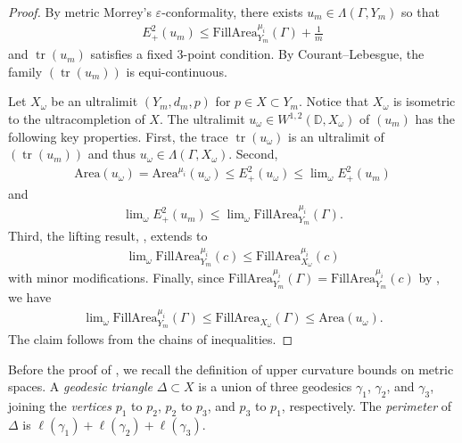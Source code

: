 \documentclass[a4paper,leqno]{amsart}
\numberwithin{equation}{section}
\theoremstyle{remark}
\theoremstyle{remark}
\DeclareMathOperator{\trace}{tr}
\begin{document}
\begin{proof}
By metric Morrey's $\varepsilon$-conformality, there exists $u_m \in \Lambda( \Gamma, Y_m )$ so that
\begin{align*}
    E^{2}_{+}( u_m ) \leq \mathrm{FillArea}^{\mu_i}_{Y_m}( \Gamma ) + \frac{ 1 }{ m }
\end{align*}
and $\trace( u_m )$ satisfies a fixed $3$-point condition. By Courant--Lebesgue, the family $( \trace( u_m ) )$ is equi-continuous.

Let $X_\omega$ be an ultralimit $( Y_m, d_m, p )$ for $p \in X \subset Y_m$. Notice that $X_\omega$ is isometric to the ultracompletion of $X$. The ultralimit $u_\omega \in W^{1,2}( \mathbb{D}, X_\omega )$ of $( u_m )$ has the following key properties. First, the trace $\trace( u_\omega )$ is an ultralimit of $( \trace( u_m ) )$ and thus $u_\omega \in \Lambda( \Gamma, X_\omega )$. Second,
\begin{align*}
    \mathrm{Area}(u_\omega) = \mathrm{Area}^{\mu_i}( u_\omega ) \leq E^{2}_{+}( u_\omega ) \leq \lim\nolimits_{\omega} E^{2}_{+}( u_m )
\end{align*}
and
\begin{align*}
    \lim\nolimits_{\omega} E^{2}_{+}( u_m )
    \leq
    \lim\nolimits_{\omega} \mathrm{FillArea}^{\mu_i}_{Y_m}( \Gamma ).
\end{align*}
Third, the lifting result, \cite[Theorem 5.1]{Wen:2019}, extends to
\begin{align*}
    \lim\nolimits_{\omega} \mathrm{FillArea}^{\mu_i}_{Y_m}( c ) \leq \mathrm{FillArea}^{\mu_i}_{X_\omega}(c)
\end{align*}
with minor modifications. Finally, since $\mathrm{FillArea}^{\mu_i}_{Y_m}( \Gamma ) = \mathrm{FillArea}^{\mu_i}_{Y_m}( c )$ by \cite[Lemma 4.8]{Lyt:Wen:18:intrinsic}, we have
\begin{align*}
    \lim\nolimits_{\omega} \mathrm{FillArea}^{\mu_i}_{Y_m}( \Gamma ) \leq \mathrm{FillArea}_{ X_\omega }( \Gamma ) \leq \mathrm{Area}( u_\omega ).
\end{align*}
The claim follows from the chains of inequalities.
\end{proof}



Before the proof of , we recall the definition of upper curvature bounds on metric spaces. A \emph{geodesic triangle} $\Delta \subset X$ is a union of three geodesics $\gamma_1$, $\gamma_2$, and $\gamma_3$, joining the \emph{vertices} $p_1$ to $p_2$, $p_2$ to $p_3$, and $p_3$ to $p_1$, respectively. The \emph{perimeter} of $\Delta$ is $\ell( \gamma_1 ) + \ell( \gamma_2 ) + \ell( \gamma_3 )$.
\end{document}
